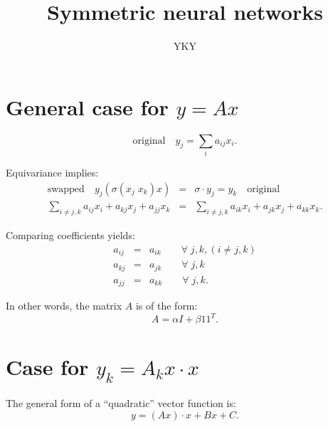 

\usepackage{xeCJK}
\usepackage{color}

\title{Symmetric neural networks}
\author{YKY}


\maketitle

\section{General case for $y = A x$}

\begin{equation}
\boxed{\mbox{original}} \quad y_j = \sum_i a_{ij} x_i .
\end{equation}

Equivariance implies:
\begin{eqnarray}
\boxed{\mbox{swapped}} \quad y_j ( \sigma(x_j \; x_k) x) &=& \sigma \cdot y_j = y_k \quad \boxed{\mbox{original}} \\
\sum_{i \neq j,k} a_{ij} x_i + a_{kj} x_j + a_{jj} x_k &=& \sum_{i \neq j,k} a_{ik} x_i + a_{jk} x_j + a_{kk} x_k . \nonumber
\end{eqnarray}


Comparing coefficients yields:
\begin{eqnarray}
a_{ij} &=& a_{ik} \quad \quad \forall \; j, k, (i \neq j, k) \nonumber \\
a_{kj} &=& a_{jk} \quad \quad \forall \; j, k \nonumber \\
a_{jj} &=& a_{kk} \quad \quad \forall \; j, k .
\end{eqnarray}

In other words, the matrix $A$ is of the form:
\begin{equation}
A = \alpha I + \beta 1 1^T .
\end{equation}

\section{Case for $y_k = A_k x \cdot x$}

The general form of a ``quadratic'' vector function is:
\begin{equation}
y = (A x) \cdot x + B x + C .
\end{equation}

